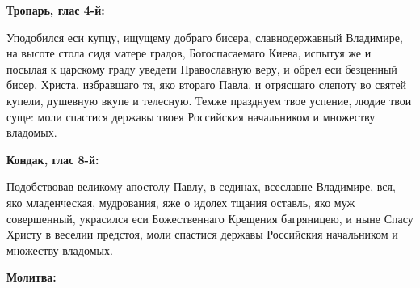 \bfseries Тропарь, глас 4-й:\normalfont{}\nopagebreak


Уподобился еси купцу, ищущему добраго бисера, славнодержавный Владимире, на высоте стола сидя матере градов, Богоспасаемаго Киева, испытуя же и посылая к царскому граду уведети Православную веру, и обрел еси безценный бисер, Христа, избравшаго тя, яко втораго Павла, и отрясшаго слепоту во святей купели, душевную вкупе и телесную. Темже празднуем твое успение, людие твои суще: моли спастися державы твоея Российския начальником и множеству владомых.


\medskip


\bfseries Кондак, глас 8-й:\normalfont{}\nopagebreak


Подобствовав великому апостолу Павлу, в сединах, всеславне Владимире, вся, яко младенческая, мудрования, яже о идолех тщания оставль, яко муж совершенный, украсился еси Божественнаго Крещения багряницею, и ныне Спасу Христу в веселии предстоя, моли спастися державы Российския начальником и множеству владомых.


\medskip


\bfseries Молитва:\normalfont{}\nopagebreak



